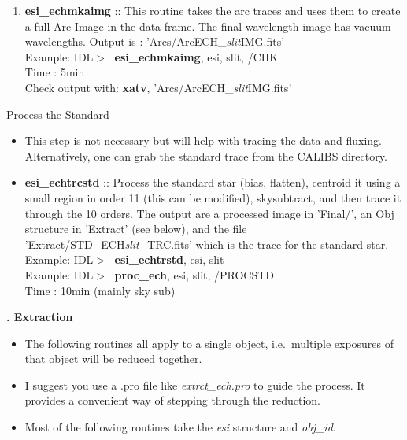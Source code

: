 \documentclass[11pt,letterpaper,dvips]{article}
\begin{document}
\begin{enumerate}
\begin{enumerate}
	\item {\bf esi\_echmkaimg} :: This routine takes the arc traces and
	uses them to create a full Arc Image in the data frame.
	The final wavelength image has vacuum wavelengths.
	Output is : 'Arcs/ArcECH\_{\it slit}IMG.fits'\\  
         \quad Example: IDL$> \;$ {\bf esi\_echmkaimg}, esi, slit, /CHK \\
         \quad Time   : 5min  \\
         \quad Check output with: {\bf xatv}, 'Arcs/ArcECH\_{\it slit}IMG.fits'
  \end{enumerate}

{\Large  \item Process the Standard}
  \begin{itemize}
	\item This step is not necessary but will help with
	tracing the data and fluxing.  Alternatively, one can grab the standard
	trace from the CALIBS directory.
	\item {\bf esi\_echtrcstd} :: Process the standard star (bias, flatten),
	centroid it using a small region in order 11 (this can be modified), 
	skysubtract, and then trace it through the 10 orders.
	The output are a processed image in 'Final/', an Obj structure in 
	'Extract' (see below), and the file 
	'Extract/STD\_ECH{\it slit}\_TRC.fits' which is the trace for the 
	standard star. \\
         \quad Example: IDL$> \;$ {\bf esi\_echtrstd}, esi, slit  \\
         \quad Example: IDL$> \;$ {\bf proc\_ech}, esi, slit, /PROCSTD \\
         \quad Time   : 10min (mainly sky sub)
  \end{itemize}

\end{enumerate}

\clearpage

\begin{center}
{\Huge {\bf {}. Extraction}}
\end{center}

  \begin{itemize}
	\item The following routines all apply to a single object, i.e.\
	multiple exposures of that object will be reduced together.
	\item I suggest you use a .pro file like {\it extrct\_ech.pro} 
	to guide the process.  It provides a convenient way 
	of stepping through the reduction.
	\item Most of the following routines take the {\it esi} structure
	and {\it obj\_id}.
  \end{itemize}
\end{document}
